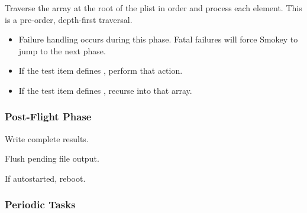 \begin{Process}[resume]

\item Traverse the  array at the root of the plist in order and
process each element.  This is a pre-order, depth-first traversal.

	\begin{itemize}

	\item Failure handling occurs during this phase.  Fatal failures will
	force Smokey to jump to the next phase.

	\item If the test item defines , perform that action.


	\item If the test item defines , recurse into that array.

	\end{itemize}

\end{Process}

\subsubsection{Post-Flight Phase}

\begin{Process}[resume]

\item Write complete results.

\item Flush pending file output.

\item If autostarted, reboot.

\end{Process}

\subsubsection{Periodic Tasks}

